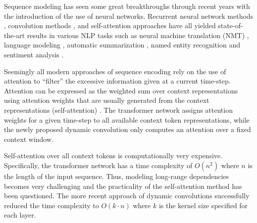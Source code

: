 \documentclass{article}
\begin{document}
Sequence modeling has seen some great breakthroughs through recent years with the introduction of the use of neural networks. Recurrent neural network methods \cite{DBLP:journals/corr/SutskeverVL14,bahdanau2014neural,DBLP:journals/corr/WuSCLNMKCGMKSJL16}, convolution methods \cite{kim-2014-convolutional,kalchbrenner-etal-2014-convolutional,DBLP:journals/corr/KalchbrennerESO16,gehring2017convolutional,wu2019pay}, and self-attention approaches \cite{DBLP:journals/corr/PaulusXS17,vaswani2017attention,DBLP:journals/corr/abs-1901-02860, kitaev2020reformer} have all yielded state-of-the-art results in various NLP tasks such as neural machine translation (NMT) \cite{DBLP:journals/corr/SutskeverVL14,DBLP:journals/corr/WuSCLNMKCGMKSJL16,DBLP:journals/corr/BritzGLL17,DBLP:journals/corr/abs-1903-00089}, language modeling \cite{Sundermeyer2012,DBLP:journals/corr/TranBM16,DBLP:journals/corr/abs-1810-04805,radford2019language}, automatic summarization \cite{DBLP:journals/corr/PaulusXS17,DBLP:journals/corr/abs-1711-05217,DBLP:journals/corr/abs-1803-10357}, named entity recognition \cite{DBLP:journals/corr/LampleBSKD16,DBLP:journals/corr/abs-1810-04805} and  sentiment analysis \cite{DBLP:journals/corr/XuCQH16,Sachan2019RevisitingLN}.

Seemingly all modern approaches of sequence encoding rely on the use of attention to ``filter'' the excessive information given at a current time-step. Attention can be expressed as the weighted sum over context representations using attention weights that are usually generated from the context representations (self-attention) \cite{Cheng_2016}. The transformer network \cite{vaswani2017attention} assigns attention weights for a given time-step to all available context token representations, while the newly proposed dynamic convolution \cite{wu2019pay} only computes an attention over a fixed context window. 

Self-attention over all context tokens is computationally very expensive. Specifically, the transformer network has a time complexity of $O(n^2)$ where $n$ is the length of the input sequence. Thus, modeling long-range dependencies becomes very challenging and the practicality of the self-attention method has been questioned.
The more recent approach of dynamic convolutions \cite{wu2019pay} successfully reduced the time complexity to $O(k{\cdot}n)$ where $k$ is 
the kernel size specified for each layer.
\end{document}
